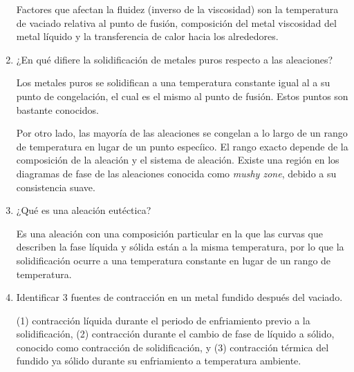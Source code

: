 \documentclass[12pt, letterpaper]{article}
\begin{document}
\begin{enumerate}
		Factores que afectan la fluidez (inverso de la viscosidad) son la temperatura de vaciado relativa al punto de fusión, composición del metal viscosidad del metal líquido y la transferencia de calor hacia los alrededores.

	\item ¿En qué difiere la solidificación de metales puros respecto a las aleaciones?

		Los metales puros se solidifican a una temperatura constante igual al a su punto de congelación, el cual es el mismo al punto de fusión. Estos puntos son bastante conocidos.

		Por otro lado, las mayoría de las aleaciones se congelan a lo largo de un rango de temperatura en lugar de un punto especíico. El rango exacto depende de la composición de la aleación y el sistema de aleación. Existe una región en los diagramas de fase de las aleaciones conocida como \textit{mushy zone}, debido a su consistencia suave.

	\item ¿Qué es una aleación eutéctica?

		Es una aleación con una composición particular en la que las curvas que describen la fase líquida y sólida están a la misma temperatura, por lo que la solidificación ocurre a una temperatura constante en lugar de un rango de temperatura.

	\item Identificar 3 fuentes de contracción en un metal fundido después del vaciado.

		(1) contracción líquida durante el periodo de enfriamiento previo a la solidificación, (2) contracción durante el cambio de fase de líquido a sólido, conocido como contracción de solidificación, y (3) contracción térmica del fundido ya sólido durante su enfriamiento a temperatura ambiente.

\end{enumerate}

\renewcommand\refname{References}
\printbibliography
\end{document}
